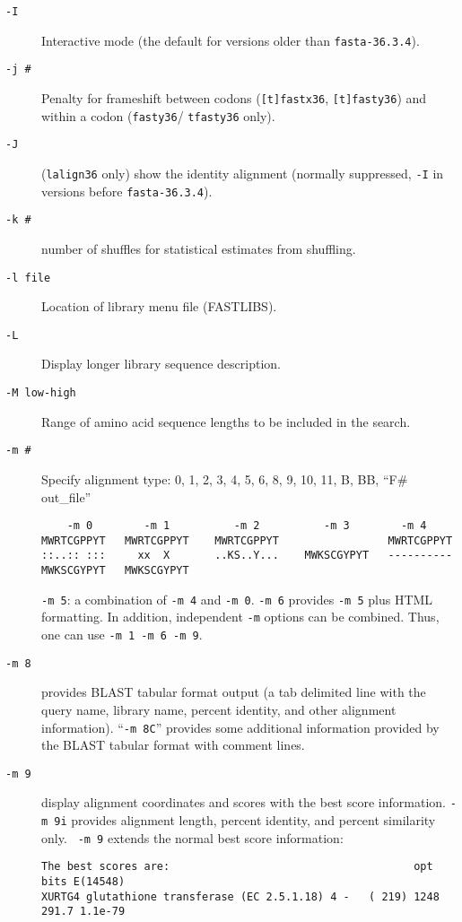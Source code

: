 \documentclass[11pt]{article}
\begin{document}
\begin{description}
\item[\texttt{-I}]
Interactive mode (the default for versions older than \texttt{fasta-36.3.4}).
\item[\texttt{-j \#}]
Penalty for frameshift between codons (\texttt{[t]fastx36}, \texttt{[t]fasty36}) and within a codon (\texttt{fasty36}/ \texttt{tfasty36} only).
\item[\texttt{-J}]
(\texttt{lalign36} only) show the identity alignment (normally
  suppressed, \texttt{-I} in versions before \texttt{fasta-36.3.4}).
\item[\texttt{-k \#}]
number of shuffles for statistical estimates from shuffling.
\item[\texttt{-l file}]
Location of library menu file (FASTLIBS).
\item[\texttt{-L}]
Display longer library sequence description.
\item[\texttt{-M low-high}]
Range of amino acid sequence lengths to be included in the search.
\item[\texttt{-m \#}]
Specify alignment type: 0, 1, 2, 3, 4, 5, 6, 8, 9, 10, 11, B, BB, ``F\# out\_file''
\begin{small}
\begin{verbatim}
    -m 0        -m 1          -m 2          -m 3        -m 4
MWRTCGPPYT   MWRTCGPPYT    MWRTCGPPYT                 MWRTCGPPYT
::..:: :::     xx  X       ..KS..Y...    MWKSCGYPYT   ----------
MWKSCGYPYT   MWKSCGYPYT
\end{verbatim}
\end{small}
\indent \texttt{-m 5}: a combination of \texttt{-m 4} and \texttt{-m
  0}. \texttt{-m 6} provides \texttt{-m 5} plus HTML formatting.  In
addition, independent \texttt{-m} options can be combined. Thus, one
can use \texttt{-m 1 -m 6 -m 9}.

\item[\texttt{-m 8}]
provides BLAST tabular format output (a tab delimited line with the
query name, library name, percent identity, and other alignment
information). ``\texttt{-m 8C}'' provides some additional information
provided by the BLAST tabular format with comment lines.
\item[\texttt{-m 9}] display alignment coordinates and scores with the
  best score information.  \texttt{-m 9i} provides alignment length,
  percent identity, and percent similarity only. \texttt{ -m 9} extends
  the normal best score information:
\begin{footnotesize}
\begin{verbatim}
The best scores are:                                      opt bits E(14548)
XURTG4 glutathione transferase (EC 2.5.1.18) 4 -   ( 219) 1248 291.7 1.1e-79
\end{verbatim}
\end{footnotesize}


\end{description}
\end{document}

